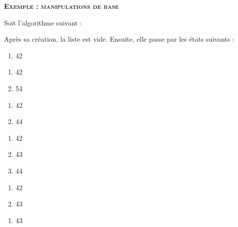 \clearpage

		{\sffamily\bfseries\scshape
		Exemple : manipulations de base}
		
		Soit l'algorithme suivant :
		
		\begin{algo}
		\end{algo}
		
		Après sa création, la liste est vide.
		Ensuite, elle passe par les états suivants :
		
		\begin{minipage}[t]{2cm}
		\begin{enumerate}[start=0]
		\item 42
		\end{enumerate}
		\end{minipage}
		\begin{minipage}[t]{2cm}
		\begin{enumerate}[start=0]
		\item 42
		\item 54
		\end{enumerate}
		\end{minipage}
		\begin{minipage}[t]{2cm}
		\begin{enumerate}[start=0]
		\item 42
		\item 44
		\end{enumerate}
		\end{minipage}
		\begin{minipage}[t]{2cm}
		\begin{enumerate}[start=0]
		\item 42
		\item 43
		\item 44
		\end{enumerate}
		\end{minipage}
		\begin{minipage}[t]{2cm}
		\begin{enumerate}[start=0]
		\item 42
		\item 43
		\end{enumerate}
		\end{minipage}
		\begin{minipage}[t]{2cm}
		\begin{enumerate}[start=0]
		\item 43
		\end{enumerate}
		\end{minipage}
		
